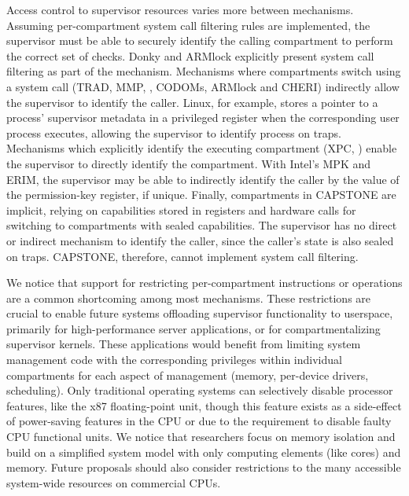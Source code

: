 Access control to supervisor resources varies more between mechanisms.
Assuming per-compartment system call filtering rules are implemented, the 
supervisor must be able to securely identify the calling compartment to
perform the correct set of checks.
Donky and ARMlock explicitly present system call filtering as part of the 
mechanism.
Mechanisms where compartments switch using a 
system call (TRAD, MMP, \lwc, CODOMs, ARMlock and CHERI) 
indirectly allow the supervisor to identify the caller. 
Linux, for example, stores a pointer to a process' supervisor metadata in a
privileged register when the corresponding user process executes, allowing
the supervisor to identify process on traps.
Mechanisms which explicitly identify the executing compartment (XPC, \seccells)
enable the supervisor to directly identify the compartment.
With Intel's MPK and ERIM, the supervisor may be able to indirectly identify the 
caller by the value of the permission-key register, if unique.
Finally, compartments in CAPSTONE are implicit, relying on capabilities
stored in registers and hardware calls for switching to compartments with
sealed capabilities.
The supervisor has no direct or indirect mechanism to identify the caller, since
the caller's state is also sealed on traps.
CAPSTONE, therefore, cannot implement system call filtering.

We notice that support for restricting per-compartment instructions or
operations are a common shortcoming among most mechanisms.
These restrictions are crucial to enable future systems offloading supervisor
functionality to userspace, primarily for high-performance server
applications, or for compartmentalizing supervisor kernels.
These applications would benefit from limiting system management code with
the corresponding privileges within individual compartments for each
aspect of management (memory, per-device drivers, scheduling).
Only traditional operating systems can selectively disable processor features,
like the x87 floating-point unit, though this feature exists as a side-effect
of power-saving features in the CPU or due to the requirement to disable
faulty CPU functional units.
We notice that researchers focus on memory isolation and build on a simplified
system model with only computing elements (like cores) and memory.
Future proposals should also consider restrictions to the many accessible 
system-wide resources on commercial CPUs.

